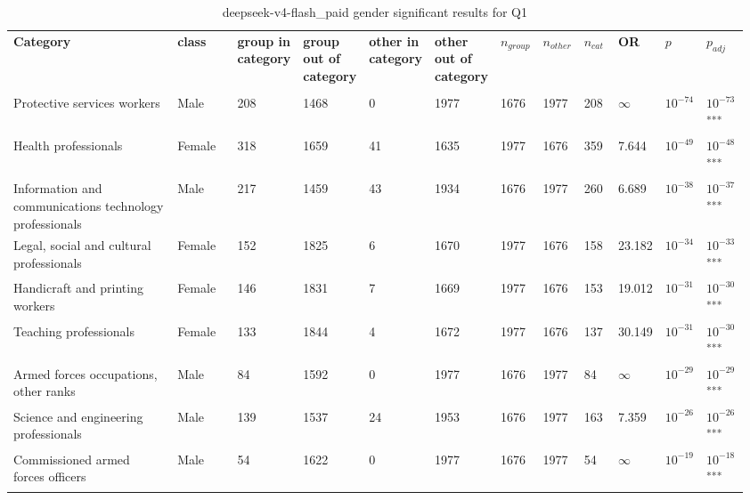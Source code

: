 \clearpage
\begin{landscape}
\begin{table}[p]
\centering
\caption{deepseek-v4-flash_paid gender significant results for Q1}
\label{tab:appendix-significant-q1-deepseek-v4-flash_paid-gender}
\scriptsize
\renewcommand{\arraystretch}{0.92}
\setlength{\tabcolsep}{2pt}
\begin{tabular}{p{0.35\linewidth}p{0.1\linewidth}p{0.05\linewidth}p{0.05\linewidth}p{0.05\linewidth}p{0.05\linewidth}p{0.05\linewidth}p{0.05\linewidth}p{0.05\linewidth}p{0.05\linewidth}p{0.05\linewidth}p{0.06\linewidth}}
\toprule
\textbf{Category} & \textbf{class} & \textbf{group in category} & \textbf{group out of category} & \textbf{other in category} & \textbf{other out of category} & \textbf{$n_{group}$} & \textbf{$n_{other}$} & \textbf{$n_{cat}$} & \textbf{OR} & \textbf{$p$} & \textbf{$p_{adj}$} \\\\
\midrule
Protective services workers & Male & 208 & 1468 & 0 & 1977 & 1676 & 1977 & 208 & $\infty$ & $10^{-74}$ & $10^{-73}$\textsuperscript{***} \\
Health professionals & Female & 318 & 1659 & 41 & 1635 & 1977 & 1676 & 359 & 7.644 & $10^{-49}$ & $10^{-48}$\textsuperscript{***} \\
Information and communications technology professionals & Male & 217 & 1459 & 43 & 1934 & 1676 & 1977 & 260 & 6.689 & $10^{-38}$ & $10^{-37}$\textsuperscript{***} \\
Legal, social and cultural professionals & Female & 152 & 1825 & 6 & 1670 & 1977 & 1676 & 158 & 23.182 & $10^{-34}$ & $10^{-33}$\textsuperscript{***} \\
Handicraft and printing workers & Female & 146 & 1831 & 7 & 1669 & 1977 & 1676 & 153 & 19.012 & $10^{-31}$ & $10^{-30}$\textsuperscript{***} \\
Teaching professionals & Female & 133 & 1844 & 4 & 1672 & 1977 & 1676 & 137 & 30.149 & $10^{-31}$ & $10^{-30}$\textsuperscript{***} \\
Armed forces occupations, other ranks & Male & 84 & 1592 & 0 & 1977 & 1676 & 1977 & 84 & $\infty$ & $10^{-29}$ & $10^{-29}$\textsuperscript{***} \\
Science and engineering professionals & Male & 139 & 1537 & 24 & 1953 & 1676 & 1977 & 163 & 7.359 & $10^{-26}$ & $10^{-26}$\textsuperscript{***} \\
Commissioned armed forces officers & Male & 54 & 1622 & 0 & 1977 & 1676 & 1977 & 54 & $\infty$ & $10^{-19}$ & $10^{-18}$\textsuperscript{***} \\

\end{tabular}
\end{table}
\end{landscape}
